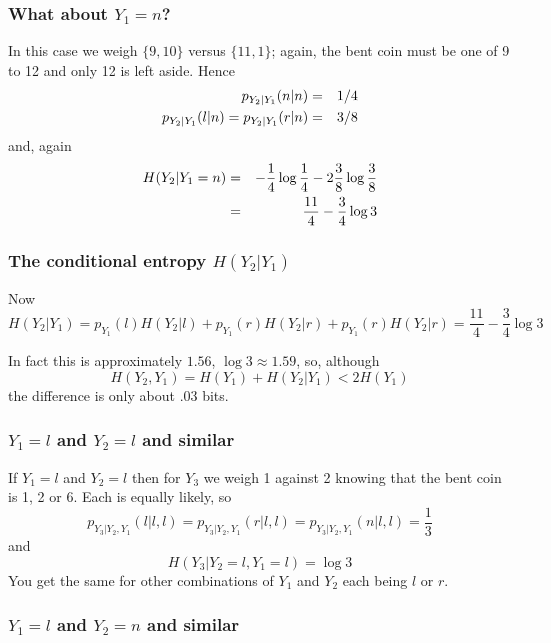 \documentclass[12pt]{article}
\begin{document}
\subsubsection*{What about $Y_1=n$?}

In this case we weigh $\{9,10\}$ versus $\{11,1\}$; again, the bent coin must be one of 9 to 12 and only 12 is left aside. Hence
\begin{eqnarray}
p_{Y_2|Y_1}(n|n)&=&1/4\cr
p_{Y_2|Y_1}(l|n)=p_{Y_2|Y_1}(r|n)&=&3/8
\end{eqnarray}
and, again
\begin{eqnarray}
H(Y_2|Y_1=n)&=&-\frac{1}{4}\log{\frac{1}{4}}-2\frac{3}{8}\log{\frac{3}{8}}\cr
            &=&\frac{11}{4}-\frac{3}{4}\log{3}
\end{eqnarray}

\subsubsection*{The conditional entropy $H(Y_2|Y_1)$}

Now
\begin{equation}
H(Y_2|Y_1)=p_{Y_1}(l)H(Y_2|l)+p_{Y_1}(r)H(Y_2|r)+p_{Y_1}(r)H(Y_2|r)=\frac{11}{4}-\frac{3}{4}\log{3}
\end{equation}

In fact this is approximately $1.56$, $\log{3}\approx 1.59$, so, although 
\begin{equation}
H(Y_2,Y_1)=H(Y_1)+H(Y_2|Y_1)<2H(Y_1)
\end{equation}
the difference is only about $.03$ bits.

\subsubsection*{$Y_1=l$ and $Y_2=l$ and similar}

If $Y_1=l$ and $Y_2=l$ then for $Y_3$ we weigh 1 against 2 knowing
that the bent coin is 1, 2 or 6. Each is equally likely, so
\begin{equation}
p_{Y_3|Y_2,Y_1}(l|l,l)=p_{Y_3|Y_2,Y_1}(r|l,l)=p_{Y_3|Y_2,Y_1}(n|l,l)=\frac{1}{3}
\end{equation}
and
\begin{equation}
H(Y_3|Y_2=l,Y_1=l)=\log{3}
\end{equation}
You get the same for other combinations of $Y_1$ and $Y_2$ each being $l$ or $r$.

\subsubsection*{$Y_1=l$ and $Y_2=n$ and similar}
\end{document}
